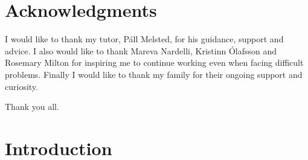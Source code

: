 \documentclass[a4paper,12pt,twoside,BCOR=10mm]{scrbook}
\begin{document}
\chapter*{Acknowledgments}


%
%
%
%
% 

I would like to thank my tutor, Páll Melsted, for his guidance, support and advice. 
I also would like to thank Mareva Nardelli, Kristinn Ólafsson and Rosemary Milton 
for inspiring me to continue working even when facing difficult problems. 
Finally I would like to thank my family for their ongoing support and curiosity.

Thank you all.

\chapter{Introduction}
\setcounter{page}{1}

\end{document}
